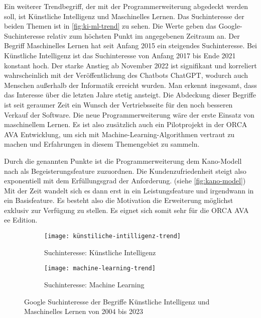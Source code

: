 Ein weiterer Trendbegriff, der mit der Programmerweiterung abgedeckt werden soll, ist \glqq Künstliche Intelligenz\grqq{} und \glqq Maschinelles Lernen\grqq{}. Das Suchinteresse der beiden Themen ist in \autoref{fig:ki-ml-trend} zu sehen. Die Werte geben das Google-Suchinteresse relativ zum höchsten Punkt im angegebenen Zeitraum an. Der Begriff \glqq Maschinelles Lernen\grqq{} hat seit Anfang 2015 ein steigendes Suchinteresse. Bei \glqq Künstliche Intelligenz\grqq{} ist das Suchinteresse von Anfang 2017 bis Ende 2021 konstant hoch. Der starke Anstieg ab November 2022 ist signifikant und korreliert wahrscheinlich mit der Veröffentlichung des Chatbots ChatGPT, wodurch auch Menschen außerhalb der Informatik erreicht wurden. Man erkennt insgesamt, dass das Interesse über die letzten Jahre stetig ansteigt. Die Abdeckung dieser Begriffe ist seit geraumer Zeit ein Wunsch der Vertriebsseite für den noch besseren Verkauf der Software. Die neue Programmerweiterung wäre der erste Einsatz von maschinellem Lernen. Es ist also zusätzlich auch ein Pilotprojekt in der ORCA AVA Entwicklung, um sich mit Machine-Learning-Algorithmen vertraut zu machen und Erfahrungen in diesem Themengebiet zu sammeln. 

Durch die genannten Punkte ist die Programmerweiterung dem Kano-Modell nach als Begeisterungsfeature zuzuordnen. Die Kundenzufriedenheit steigt also exponentiell mit dem Erfüllungsgrad der Anforderung. (siehe \autoref{fig:kano-model}) Mit der Zeit wandelt sich es dann erst in ein Leistungsfeature und irgendwann in ein Basisfeature. \citep[vgl.][p.~3-4]{Hölzing_2008} Es besteht also die Motivation die Erweiterung möglichst exklusiv zur Verfügung zu stellen. Es eignet sich somit sehr für die ORCA AVA \ac{ee} Edition.

\begin{figure}[h]
	\centering
	
	\begin{subfigure}{0.99\textwidth}
		\centering
	\texttt{[image: künstiliche-intilligenz-trend]}
		\caption{Suchinteresse: Künstliche Intelligenz}
		\label{FIG:ki-trend}
	\end{subfigure}
	\hspace{1cm}
	\begin{subfigure}{0.99\textwidth}
		\centering
	\texttt{[image: machine-learning-trend]}
		\caption{Suchinteresse: Machine Learning}
		\label{FIG:ml-trend}
	\end{subfigure}
	
	\caption[Google Suchinteresse von \glqq Künstliche Intelligenz\grqq{} und \glqq Maschinelles Lernen{}]{Google Suchinteresse der Begriffe \glqq Künstliche Intelligenz\grqq{} und \glqq Maschinelles Lernen\grqq{} von 2004 bis 2023}
	\label{fig:ki-ml-trend}
\end{figure}

